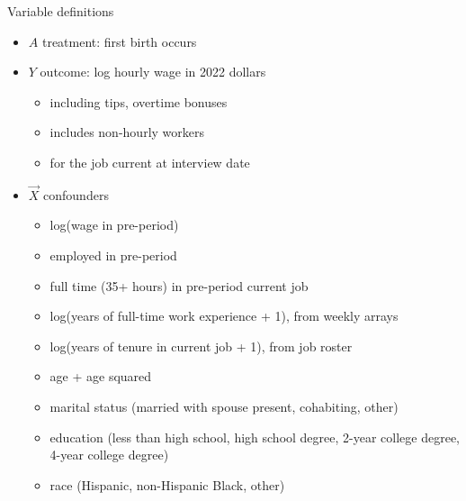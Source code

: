 \documentclass{beamer}
\newcommand\bgray[1]{\textcolor{gray}{\textbf{#1}}}
\begin{document}
\begin{frame}{Variable definitions}
\begin{itemize}
\item $A$ treatment: first birth occurs
\item $Y$ outcome: log hourly wage in 2022 dollars
\begin{itemize}
\item including tips, overtime bonuses
\item includes non-hourly workers
\item for the job current at interview date
\end{itemize}
\item $\vec{X}$ confounders
\begin{itemize}
\item log(wage in pre-period)
\item employed in pre-period
\item full time (35+ hours) in pre-period current job
\item log(years of full-time work experience + 1), from weekly arrays
\item log(years of tenure in current job + 1), from job roster
\item age + age squared
\item marital status (married with spouse present, cohabiting, other)
\item education (less than high school, high school degree, 2-year college degree, 4-year college degree)
\item race (Hispanic, non-Hispanic Black, other)
\end{itemize}
\end{itemize}
\end{frame}

\end{document}

